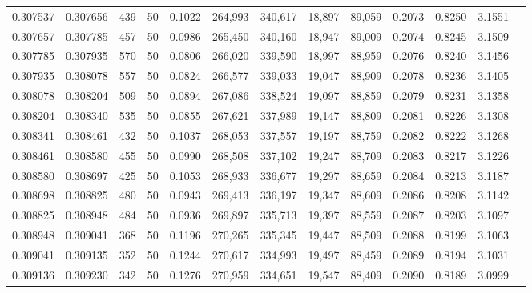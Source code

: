 \begin{tabular}{rrrrrrrrrrrrr}
0.307537 & 0.307656 &   439 &  50 &                                     0.1022 & 264,993 & 340,617 &  18,897 &  89,059 & 0.2073 & 0.8250 & 3.1551 \\
0.307657 & 0.307785 &   457 &  50 &                                     0.0986 & 265,450 & 340,160 &  18,947 &  89,009 & 0.2074 & 0.8245 & 3.1509 \\
0.307785 & 0.307935 &   570 &  50 &                                     0.0806 & 266,020 & 339,590 &  18,997 &  88,959 & 0.2076 & 0.8240 & 3.1456 \\
0.307935 & 0.308078 &   557 &  50 &                                     0.0824 & 266,577 & 339,033 &  19,047 &  88,909 & 0.2078 & 0.8236 & 3.1405 \\
0.308078 & 0.308204 &   509 &  50 &                                     0.0894 & 267,086 & 338,524 &  19,097 &  88,859 & 0.2079 & 0.8231 & 3.1358 \\
0.308204 & 0.308340 &   535 &  50 &                                     0.0855 & 267,621 & 337,989 &  19,147 &  88,809 & 0.2081 & 0.8226 & 3.1308 \\
0.308341 & 0.308461 &   432 &  50 &                                     0.1037 & 268,053 & 337,557 &  19,197 &  88,759 & 0.2082 & 0.8222 & 3.1268 \\
0.308461 & 0.308580 &   455 &  50 &                                     0.0990 & 268,508 & 337,102 &  19,247 &  88,709 & 0.2083 & 0.8217 & 3.1226 \\
0.308580 & 0.308697 &   425 &  50 &                                     0.1053 & 268,933 & 336,677 &  19,297 &  88,659 & 0.2084 & 0.8213 & 3.1187 \\
0.308698 & 0.308825 &   480 &  50 &                                     0.0943 & 269,413 & 336,197 &  19,347 &  88,609 & 0.2086 & 0.8208 & 3.1142 \\
0.308825 & 0.308948 &   484 &  50 &                                     0.0936 & 269,897 & 335,713 &  19,397 &  88,559 & 0.2087 & 0.8203 & 3.1097 \\
0.308948 & 0.309041 &   368 &  50 &                                     0.1196 & 270,265 & 335,345 &  19,447 &  88,509 & 0.2088 & 0.8199 & 3.1063 \\
0.309041 & 0.309135 &   352 &  50 &                                     0.1244 & 270,617 & 334,993 &  19,497 &  88,459 & 0.2089 & 0.8194 & 3.1031 \\
0.309136 & 0.309230 &   342 &  50 &                                     0.1276 & 270,959 & 334,651 &  19,547 &  88,409 & 0.2090 & 0.8189 & 3.0999 \\

\end{tabular}
